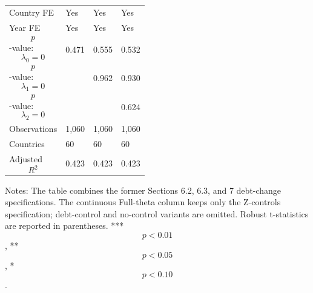 \begin{table}[H]
\begin{threeparttable}
\begin{tabularx}{\textwidth}{lYYY}
Country FE & Yes & Yes & Yes \\
Year FE & Yes & Yes & Yes \\
$$p$$-value: $$\lambda_0=0$$ & 0.471 & 0.555 & 0.532 \\
$$p$$-value: $$\lambda_1=0$$ &  & 0.962 & 0.930 \\
$$p$$-value: $$\lambda_2=0$$ &  &  & 0.624 \\
Observations & 1,060 & 1,060 & 1,060 \\
Countries & 60 & 60 & 60 \\
Adjusted $$R^2$$ & 0.423 & 0.423 & 0.423 \\
\bottomrule
\end{tabularx}
\begin{tablenotes}[flushleft]\footnotesize
\item Notes: The table combines the former Sections 6.2, 6.3, and 7 debt-change specifications. The continuous Full-theta column keeps only the Z-controls specification; debt-control and no-control variants are omitted. Robust t-statistics are reported in parentheses. *** $$p<0.01$$, ** $$p<0.05$$, * $$p<0.10$$.
\end{tablenotes}
\end{threeparttable}
\end{table}
